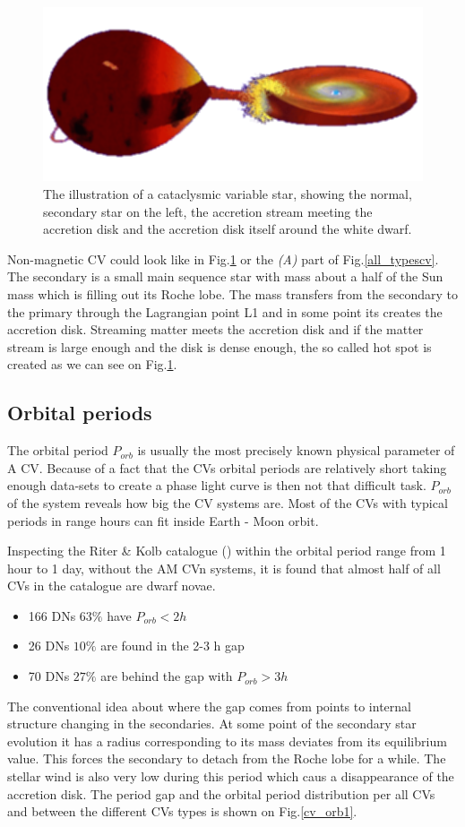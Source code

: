 \documentclass[oneside,a4paper,11pt]{report}
\begin{document}
\begin{figure}[hbt]
\centering
\includegraphics[totalheight=3cm]{plot/cv}
\caption{The illustration of a cataclysmic variable star, showing the normal, secondary star on the left, the accretion stream meeting 
the accretion disk and the accretion disk itself around the white dwarf. }
\label{cv1} 
\end{figure}

Non-magnetic CV could look like in Fig.\ref{cv1} or the \textit{(A)} part of Fig.\ref{all_typescv}. The secondary is a small main sequence star with mass about 
a half of the Sun mass which is filling out its Roche lobe. The mass transfers from the secondary to the primary
through the Lagrangian point L1 and in some point its creates the accretion disk. Streaming matter meets the accretion disk and if the matter stream is large enough and the 
disk is dense enough, the so called 
hot spot is created as we can see on Fig.\ref{cv1}.  

\subsection{Orbital periods}
The orbital period $P_{orb}$ is usually the most precisely known physical parameter of A CV. Because of a fact that the 
CVs orbital periods are relatively short taking enough data-sets to create a phase light curve 
is then not that difficult task. $P_{orb}$ of the system reveals how big the CV systems are. Most of the 
CVs with typical periods in range hours can fit inside Earth - Moon orbit. 

Inspecting the Riter \& Kolb catalogue (\citet{2003A&A...404..301R}) within the orbital period range from 1 hour to 1 day, without the AM CVn systems, 
it is found that almost half of all CVs in the catalogue are dwarf novae.
\begin{itemize}
 \item 166 DNs $63\%$ have $P_{orb} < 2h$
 \item 26 DNs $10\%$ are found in the 2-3 h gap 
 \item 70 DNs $27\%$ are behind the gap with $P_{orb} > 3h$  
\end{itemize}
The conventional idea about where the gap comes from points to internal structure changing in the secondaries.   
At some point of the secondary star evolution it has a radius corresponding to its mass deviates from its equilibrium value. 
This forces the secondary to detach from the Roche lobe for a while. The stellar wind is also very low during this period which caus a disappearance of the accretion disk.
The period gap and the orbital period distribution per all CVs and between the different CVs types is shown on Fig.\ref{cv_orb1}.  
\end{document}
